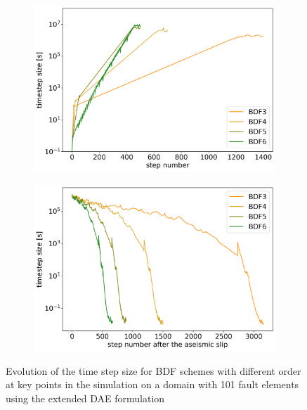 \begin{figure}[H]
	\centering
	\begin{subfigure}[b]{0.45\textwidth}
		\centering
		\includegraphics[width=1\textwidth]{images/TANDEMTimeAnalysisDifferentBDFOrdersLagrange_ExtendedDAE_Size101_Init.png}
		\label{fig:BDFOrders_extended_DAE_compare_initialization}
	\end{subfigure}
	\begin{subfigure}[b]{0.45\textwidth}
		\centering
		\includegraphics[width=1\textwidth]{images/TANDEMTimeAnalysisDifferentBDFOrdersLagrange_ExtendedDAE_Size101_Begin1stEQ.png}
		\label{fig:BDFOrders_extended_DAE_compare_begin_first_EQ}
	\end{subfigure}
	\caption{Evolution of the time step size for BDF schemes with different order at key points in the simulation on a domain with 101 fault elements using the extended DAE formulation}
\end{figure}

